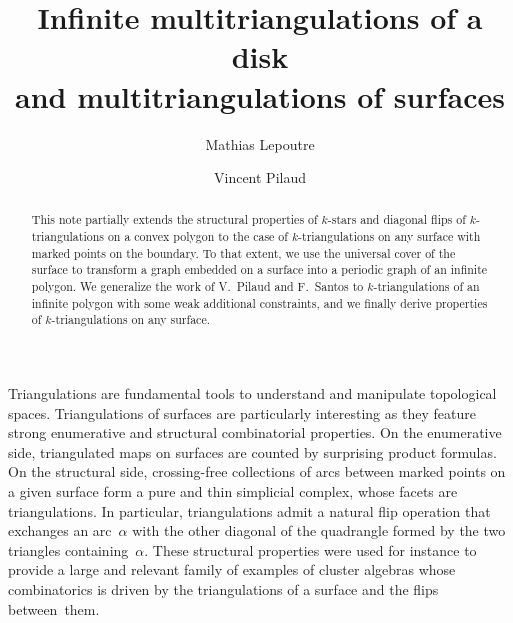 \documentclass{amsart}
\title[Infinite multitriangulations of a disk and multitriangulations of surfaces]{Infinite multitriangulations of a disk \\ and multitriangulations of surfaces}
\author{Mathias Lepoutre}
\author{Vincent Pilaud}
\theoremstyle{remark}
\begin{document}
\begin{abstract}
This note partially extends the structural properties of $k$-stars and diagonal flips of $k$-triangulations on a convex polygon to the case of $k$-triangulations on any surface with marked points on the boundary. 
To that extent, we use the universal cover of the surface to transform a graph embedded on a surface into a periodic graph of an infinite polygon.
We generalize the work of V.~Pilaud and F.~Santos to $k$-triangulations of an infinite polygon with some weak additional constraints, and we finally derive properties of $k$-triangulations on any surface.
\end{abstract}

\maketitle


Triangulations are fundamental tools to understand and manipulate topological spaces.
Triangulations of surfaces are particularly interesting as they feature strong enumerative and structural combinatorial properties.
On the enumerative side, triangulated maps on surfaces are counted by surprising product formulas. %
On the structural side, crossing-free collections of arcs between marked points on a given surface form a pure and thin simplicial complex, whose facets are triangulations.
In particular, triangulations admit a natural flip operation that exchanges an arc~$\alpha$ with the other diagonal of the quadrangle formed by the two triangles containing~$\alpha$.
These structural properties were used for instance to provide a large and relevant family of examples of cluster algebras whose combinatorics is driven by the triangulations of a surface and the flips between~them.
\end{document}
